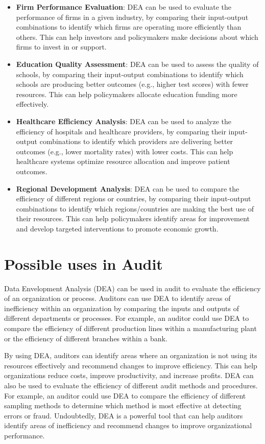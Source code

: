 \documentclass[
]{book}
\begin{document}
\begin{itemize}
\item
  \textbf{Firm Performance Evaluation}: DEA can be used to evaluate the performance of firms in a given industry, by comparing their input-output combinations to identify which firms are operating more efficiently than others. This can help investors and policymakers make decisions about which firms to invest in or support.
\item
  \textbf{Education Quality Assessment}: DEA can be used to assess the quality of schools, by comparing their input-output combinations to identify which schools are producing better outcomes (e.g., higher test scores) with fewer resources. This can help policymakers allocate education funding more effectively.
\item
  \textbf{Healthcare Efficiency Analysis}: DEA can be used to analyze the efficiency of hospitals and healthcare providers, by comparing their input-output combinations to identify which providers are delivering better outcomes (e.g., lower mortality rates) with lower costs. This can help healthcare systems optimize resource allocation and improve patient outcomes.
\item
  \textbf{Regional Development Analysis}: DEA can be used to compare the efficiency of different regions or countries, by comparing their input-output combinations to identify which regions/countries are making the best use of their resources. This can help policymakers identify areas for improvement and develop targeted interventions to promote economic growth.
\end{itemize}

\hypertarget{possible-uses-in-audit}{%
\section{Possible uses in Audit}\label{possible-uses-in-audit}}

Data Envelopment Analysis (DEA) can be used in audit to evaluate the efficiency of an organization or process. Auditors can use DEA to identify areas of inefficiency within an organization by comparing the inputs and outputs of different departments or processes. For example, an auditor could use DEA to compare the efficiency of different production lines within a manufacturing plant or the efficiency of different branches within a bank.

By using DEA, auditors can identify areas where an organization is not using its resources effectively and recommend changes to improve efficiency. This can help organizations reduce costs, improve productivity, and increase profits. DEA can also be used to evaluate the efficiency of different audit methods and procedures. For example, an auditor could use DEA to compare the efficiency of different sampling methods to determine which method is most effective at detecting errors or fraud. Undoubtedly, DEA is a powerful tool that can help auditors identify areas of inefficiency and recommend changes to improve organizational performance.
\end{document}
